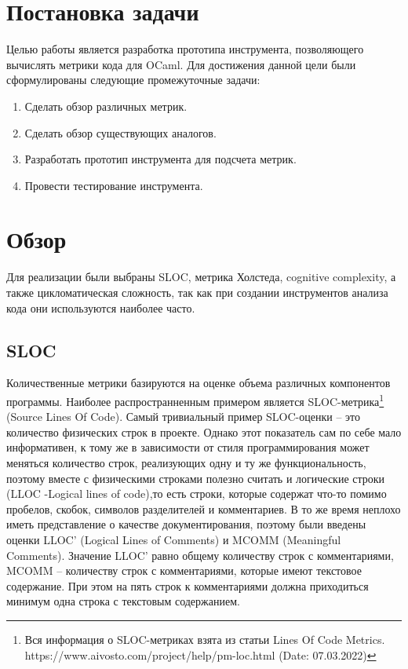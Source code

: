 \section{Постановка задачи}
Целью работы является разработка прототипа инструмента, позволяющего вычислять метрики кода для OCaml. Для достижения данной цели были сформулированы следующие промежуточные задачи:
\begin{enumerate}
    \item Сделать обзор различных метрик.
    \item Сделать обзор существующих аналогов.
    \item Разработать прототип инструмента для подсчета метрик.
    \item Провести тестирование инструмента.
\end{enumerate}
\section{Обзор}
Для реализации были выбраны SLOC, метрика
Холстеда, cognitive complexity, а также цикломатическая сложность, так как при 
создании инструментов анализа кода они используются наиболее часто.
\subsection{SLOC}
Количественные метрики базируются на оценке объема различных компонентов программы. Наиболее распространненным примером является SLOC-метрика\footnote{Вся информация о
SLOC-метриках взята из статьи Lines Of Code Metrics. https://www.aivosto.com/project/help/pm-loc.html (Date: 07.03.2022)} (Source Lines Of Code). Самый тривиальный пример SLOC-оценки -- это количество физических строк в проекте. Однако этот показатель сам по себе мало информативен, к тому же в зависимости от стиля программирования может меняться количество строк, реализующих одну и ту же функциональность, поэтому вместе с физическими строками полезно считать и логические строки (LLOC -Logical lines of code),то есть строки, которые содержат что-то помимо пробелов, скобок, символов разделителей и комментариев. В то же время неплохо иметь представление о качестве документирования, поэтому были введены оценки LLOC' (Logical Lines of Comments)
и MCOMM (Meaningful Comments). Значение LLOC' равно общему количеству строк с комментариями, MCOMM -- количеству строк с комментариями, которые имеют текстовое содержание. При этом на пять строк к комментариями должна приходиться минимум одна
строка с текстовым содержанием. 

